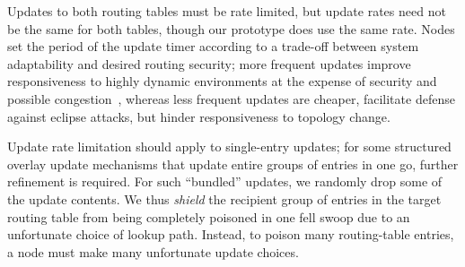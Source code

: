 \documentclass[10pt,twocolumn]{article}
\begin{document}
Updates to both routing tables must be rate
limited, but update rates need not be the same for both
tables, though our prototype does use the same rate.
Nodes set the period of the update
timer according to a trade-off between system adaptability and desired
routing security;  more frequent updates improve responsiveness to highly
dynamic environments at the expense of security and possible
congestion~\cite{Rhea2004}, whereas less frequent updates are cheaper,
facilitate defense against eclipse attacks, but hinder responsiveness to
topology change.

Update rate limitation should apply to single-entry updates; for some
structured overlay
update mechanisms that update entire groups of entries in one go, further
refinement is required.  For such ``bundled'' updates, we randomly
drop some of the update contents.   We thus \emph{shield} the recipient
group of entries in the target routing table from being completely
poisoned in one fell swoop due to an unfortunate choice of lookup
path. Instead, to poison many routing-table entries, a node must make many unfortunate
update choices.


\label{sec:Optimizations}
\end{document}
